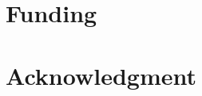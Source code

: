 \documentclass{bioinfo}
\begin{document}

\section*{Funding}

\section*{Acknowledgment}







 
\end{document}
